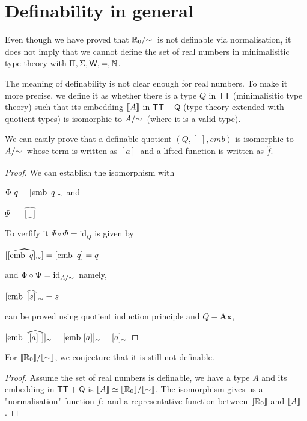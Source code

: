 \section{Definability in general}


Even though we have proved that $\qset{\R_0}$ is not definable via normalisation, it does not imply that we cannot define the set of real numbers in minimalisitic type theory with $\Pi, \Sigma, \mathsf{W}, =,
\mathbb{N}$. 

The meaning of definability is not clear enough for real numbers. To make it more precise, we define
it as whether there is a type $Q$ in $\mathsf{TT}$ (minimalisitic type
theory) such that its embedding $\llbracket A\rrbracket$ in $\mathsf{TT} + \mathsf{Q}$ (type theory
extended with quotient types) is isomorphic to $\qset{A}$ (where it is a valid type). 



We can easily prove that a definable quotient $(Q, [\_], emb)$ is isomorphic to $\qset{A}$ whose term is written as $[ a ]_{~}$ and a lifted function is written as $\hat{f}$.

\begin{proof}
We can establish the isomorphism with

$\Phi ~q =  [ \operatorname{emb} ~q ]_{\sim}$ and 

$\Psi ~ = \widehat{[\_]}$

To verfify it $\Psi \circ \Phi = \text{id}_{Q}$ is given by

$\widehat{[  [ \operatorname{emb} ~q ]_{\sim} ]} = [\operatorname{emb} ~ q] = q$

and $\Phi \circ \Psi = \text{id}_{\qset{A}}$ namely,

$[\operatorname{emb}~\widehat{[s]}]_{\sim} = s$

can be proved using quotient induction principle and $Q-\textbf{Ax}$,

$[\operatorname{emb}~\widehat{[ [a]_{~} ]}]_{\sim} = [\operatorname{emb}~[a]]_{\sim} = [a]_{\sim}$

\end{proof}


For $\llbracket \mathbb{R}_0\rrbracket/ \llbracket \sim\rrbracket$, we conjecture that it is still not
definable.

\begin{proof}
Assume the set of real numbers is definable, we have a type $A$ and
its embedding in $\mathsf{TT} + \mathsf{Q}$  is $\llbracket A\rrbracket \simeq \llbracket \mathbb{R}_0\rrbracket/ \llbracket \sim\rrbracket$. The isomorphism gives us a "normalisation" function $f : $ and a representative function
between $\llbracket \mathbb{R}_0\rrbracket$ and $\llbracket A\rrbracket$.
\end{proof}







